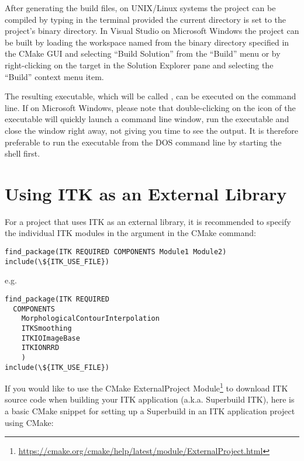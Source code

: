 After generating the build files, on UNIX/Linux systems the project can be
compiled by typing  in the terminal provided the current directory
is set to the project's binary directory. In Visual Studio on Microsoft Windows
the project can be built by loading the workspace named 
from the binary directory specified in the CMake GUI and selecting
``Build Solution'' from the ``Build'' menu or by right-clicking on
the  target in the Solution Explorer pane and selecting
the ``Build'' context menu item.

The resulting executable, which will be called , can be
executed on the command line. If on Microsoft Windows, please note that
double-clicking on the icon of the executable will quickly launch a command line
window, run the executable and close the window right away, not giving you time
to see the output. It is therefore preferable to run the executable from the DOS
command line by starting the  shell first.

\section{Using ITK as an External Library}
\label{sec:UsingITKAsExternalLibrary}

For a project that uses ITK as an external library, it is recommended to
specify the individual ITK modules in the  argument in the
 CMake command:

\small
\begin{verbatim}
find_package(ITK REQUIRED COMPONENTS Module1 Module2)
include(\${ITK_USE_FILE})
\end{verbatim}
\normalsize

e.g.

\small
\begin{verbatim}
find_package(ITK REQUIRED
  COMPONENTS
    MorphologicalContourInterpolation
    ITKSmoothing
    ITKIOImageBase
    ITKIONRRD
    )
include(\${ITK_USE_FILE})
\end{verbatim}
\normalsize

If you would like to use the CMake ExternalProject
Module\footnote{\url{https://cmake.org/cmake/help/latest/module/ExternalProject.html}}
to download ITK source code when building your ITK application (a.k.a.
Superbuild ITK), here is a basic CMake snippet for setting up a Superbuild in
an ITK application project using CMake:

